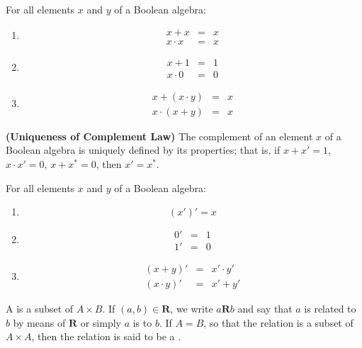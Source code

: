 \begin{theorem}
  For all elements $x$ and $y$ of a Boolean algebra:
  \begin{enumerate}[label=\textbf{(\alph*)}]
    \item {}
    \begin{eqnarray*}
    x + x & = & x \\
    x \cdot x & = & x
    \end{eqnarray*}
    \item {}
    \begin{eqnarray*}
    x + 1 & = & 1 \\
    x \cdot 0 & = & 0
    \end{eqnarray*}
    \item {}
    \begin{eqnarray*}
    x + (x \cdot y) & = & x \\
    x \cdot (x + y) & = & x
    \end{eqnarray*}
  \end{enumerate}
\end{theorem}

\begin{theorem}
  \textbf{(Uniqueness of Complement Law)} The complement of an element $x$ of a Boolean algebra is uniquely defined by its properties; that is, if $x + x' = 1$, $x \cdot x' = 0$, $x + x^* = 0$, then $x' = x^*$.
\end{theorem}

\begin{theorem}
  For all elements $x$ and $y$ of a Boolean algebra:
  \begin{enumerate}[label=\textbf{(\alph*)}]
    \item {}
    \[(x')' = x\]
    \item {}
    \begin{eqnarray*}
      0' & = & 1\\
      1' & = & 0
    \end{eqnarray*}
    \item {}
    \begin{eqnarray*}
      (x + y)' & = & x' \cdot y'\\
      (x \cdot y)' & = & x' + y'
    \end{eqnarray*}
  \end{enumerate}
\end{theorem}

\begin{definition}
  A  is a subset of $A \times B$. If $(a, b) \in \mathbf{R}$, we write $a\mathbf{R}b$ and say that $a$ is related to $b$ by means of $\mathbf{R}$ or simply $a$ is  to $b$. If $A = B$, so that the relation is a subset of $A \times A$, then the relation is said to be a .
\end{definition}

